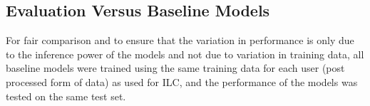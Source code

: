 

\subsection{Evaluation Versus Baseline Models}
For fair comparison and to ensure that the variation in performance is only due to the inference power of the models and not due to variation in training data, all baseline models were trained using the same training data for each user (post processed form of data) as used for ILC, and the performance of the models was tested on the same test set. %

